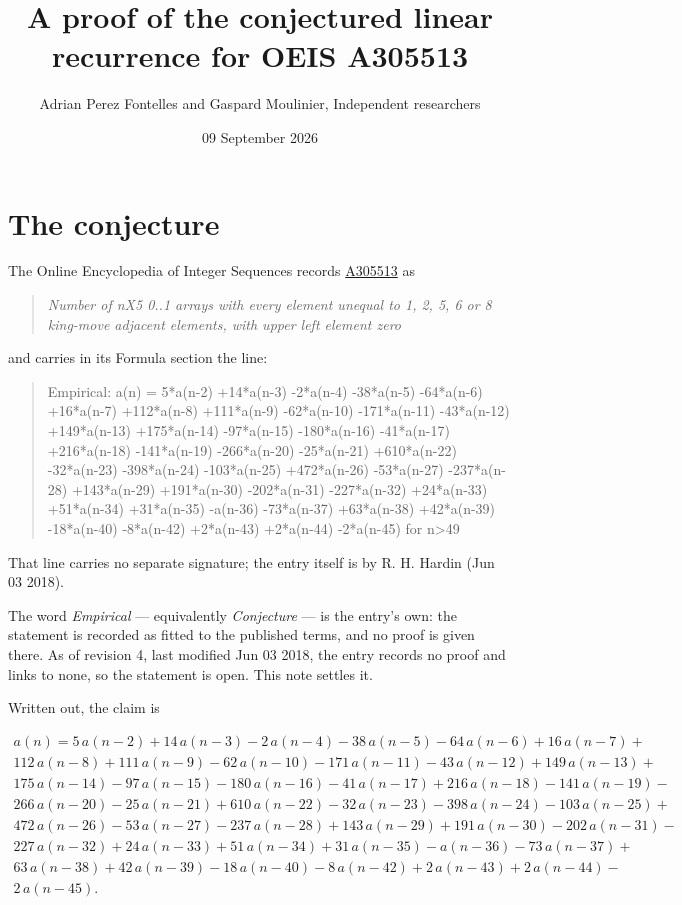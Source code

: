 \documentclass[11pt]{article}
\title{A proof of the conjectured linear recurrence for OEIS A305513}
\author{Adrian Perez Fontelles and Gaspard Moulinier, Independent researchers}
\date{09 September 2026}
\theoremstyle{definition}
\begin{document}
\maketitle
\section{The conjecture}

The Online Encyclopedia of Integer Sequences records \href{https://oeis.org/A305513}{A305513} as

\begin{quote}\itshape Number of nX5 0..1 arrays with every element unequal to 1, 2, 5, 6 or 8 king-move adjacent elements, with upper left element zero\end{quote}

and carries in its Formula section the line:

\begin{quote}\ttfamily Empirical: a(n) = 5*a(n-2) +14*a(n-3) -2*a(n-4) -38*a(n-5) -64*a(n-6) +16*a(n-7) +112*a(n-8) +111*a(n-9) -62*a(n-10) -171*a(n-11) -43*a(n-12) +149*a(n-13) +175*a(n-14) -97*a(n-15) -180*a(n-16) -41*a(n-17) +216*a(n-18) -141*a(n-19) -266*a(n-20) -25*a(n-21) +610*a(n-22) -32*a(n-23) -398*a(n-24) -103*a(n-25) +472*a(n-26) -53*a(n-27) -237*a(n-28) +143*a(n-29) +191*a(n-30) -202*a(n-31) -227*a(n-32) +24*a(n-33) +51*a(n-34) +31*a(n-35) -a(n-36) -73*a(n-37) +63*a(n-38) +42*a(n-39) -18*a(n-40) -8*a(n-42) +2*a(n-43) +2*a(n-44) -2*a(n-45) for n>49\end{quote}

That line carries no separate signature; the entry itself is by R. H. Hardin (Jun 03 2018).

The word {\itshape Empirical} --- equivalently {\itshape Conjecture} --- is the entry's own: the statement is recorded as fitted to the published terms, and no proof is given there. As of revision 4, last modified Jun 03 2018, the entry records no proof and links to none, so the statement is open. This note settles it.

Written out, the claim is

\begin{multline*} a(n) = 5\,a(n-2) + 14\,a(n-3) - 2\,a(n-4) - 38\,a(n-5) - 64\,a(n-6) + 16\,a(n-7) + \\ 112\,a(n-8) + 111\,a(n-9) - 62\,a(n-10) - 171\,a(n-11) - 43\,a(n-12) + 149\,a(n-13) + \\ 175\,a(n-14) - 97\,a(n-15) - 180\,a(n-16) - 41\,a(n-17) + 216\,a(n-18) - 141\,a(n-19) - \\ 266\,a(n-20) - 25\,a(n-21) + 610\,a(n-22) - 32\,a(n-23) - 398\,a(n-24) - 103\,a(n-25) + \\ 472\,a(n-26) - 53\,a(n-27) - 237\,a(n-28) + 143\,a(n-29) + 191\,a(n-30) - 202\,a(n-31) - \\ 227\,a(n-32) + 24\,a(n-33) + 51\,a(n-34) + 31\,a(n-35) - a(n-36) - 73\,a(n-37) + \\ 63\,a(n-38) + 42\,a(n-39) - 18\,a(n-40) - 8\,a(n-42) + 2\,a(n-43) + 2\,a(n-44) - \\ 2\,a(n-45). \end{multline*}
\end{document}
